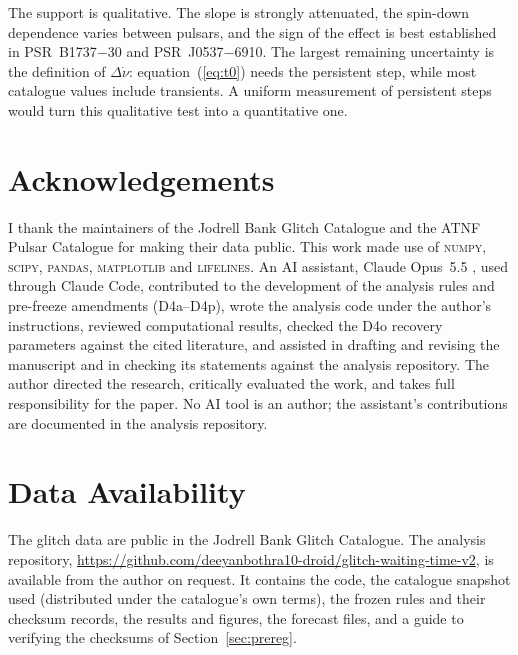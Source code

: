 \documentclass[fleqn,usenatbib]{mnras}
\newcommand{\psr}[1]{PSR~#1}
\begin{document}
The support is qualitative. The slope is strongly attenuated, the
spin-down dependence varies between pulsars, and the sign of the effect is
best established in \psr{B1737$-$30} and \psr{J0537$-$6910}. The largest
remaining uncertainty is the definition of $\Delta\dot\nu$:
equation~(\ref{eq:t0}) needs the persistent step, while most catalogue
values include transients. A uniform measurement of persistent steps would
turn this qualitative test into a quantitative one.

\section*{Acknowledgements}
I thank the maintainers of the Jodrell Bank Glitch Catalogue and the ATNF
Pulsar Catalogue for making their data public. This work made use of
\textsc{numpy}, \textsc{scipy}, \textsc{pandas}, \textsc{matplotlib} and
\textsc{lifelines}. An AI assistant, Claude Opus~5.5 \citep{anthropic2026},
used through Claude Code, contributed to the development of the analysis
rules and pre-freeze amendments (D4a--D4p), wrote the analysis code under
the author's instructions, reviewed computational results, checked the D4o
recovery parameters against the cited literature, and assisted in drafting
and revising the manuscript and in checking its statements against the
analysis repository. The author directed the research, critically evaluated
the work, and takes full responsibility for the paper. No AI tool is an
author; the assistant's contributions are documented in the analysis
repository.

\section*{Data Availability}
The glitch data are public in the Jodrell Bank Glitch Catalogue. The
analysis repository,
\url{https://github.com/deeyanbothra10-droid/glitch-waiting-time-v2}, is
available from the author on request. It contains the code, the catalogue snapshot used (distributed under the
catalogue's own terms), the frozen rules and their checksum records, the
results and figures, the forecast files, and a guide to verifying the
checksums of Section~\ref{sec:prereg}.
\end{document}
